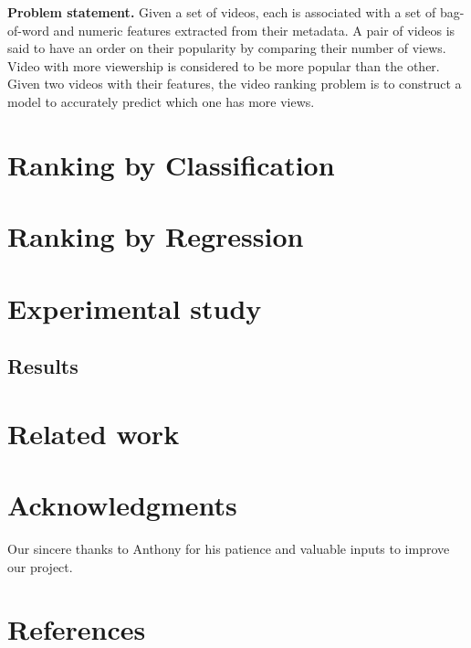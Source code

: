 \documentclass{article} %
\begin{document}
	\textbf{Problem statement.} Given a set of videos, each is associated with a set of bag-of-word and numeric features extracted from their metadata. A pair of videos is said to have an order on their popularity by comparing their number of views. Video with more viewership is considered to be more popular than the other. Given two videos with their features, the video ranking problem is to construct a model to accurately predict which one has more views.

\section{Ranking by Classification}
\label{sec:ranking}
	
\section{Ranking by Regression}
\label{sec:regression}
	
\section{Experimental study}
\label{sec:experiment}
	
\subsection{Results}
\label{sec:results}
	
\section{Related work}
\label{sec:related}
	

\section*{Acknowledgments}
	Our sincere thanks to Anthony for his patience and valuable inputs to improve our project.

\section*{References}
\label{sec:references}
	
\end{document}
